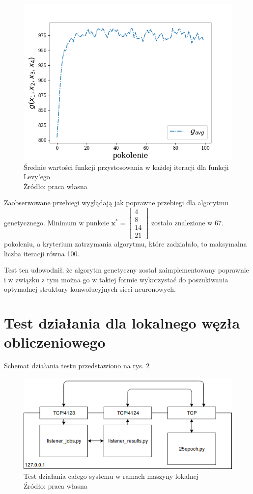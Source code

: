 \begin{figure}[h!tb]
	 \centering
	 \includegraphics[width = 0.85\linewidth]{img/levy_means}
	 \caption{Średnie wartości funkcji przystosowania w każdej iteracji dla funkcji Levy'ego \\
              Źródło: praca własna}
	 \label{fig:levy_means}
\end{figure}

Zaobserwowane przebiegi wyglądają jak poprawne przebiegi dla algorytmu genetycznego.
Minimum w punkcie $\mathbf{x^*} = \begin{bmatrix}4 \\ 8 \\ 14 \\ 21\end{bmatrix}$ zostało znalezione w 67. pokoleniu, a kryterium zatrzymania algorytmu, które zadziałało, to maksymalna liczba iteracji równa 100.

Test ten udowodnił, że algorytm genetyczny został zaimplementowany poprawnie i w związku z tym można go w takiej formie wykorzystać do poszukiwania optymalnej struktury konwolucyjnych sieci neuronowych.

\section{Test działania dla lokalnego węzła obliczeniowego}

Schemat działania testu przedstawiono na rys. \ref{fig:localhost_test}

\begin{figure}[h!tb]
	 \centering
	 \includegraphics[width = 1.0\linewidth]{img/localhost_test}
	 \caption{Test działania całego systemu w ramach maszyny lokalnej\\
              Źródło: praca własna}
	 \label{fig:localhost_test}
\end{figure}

